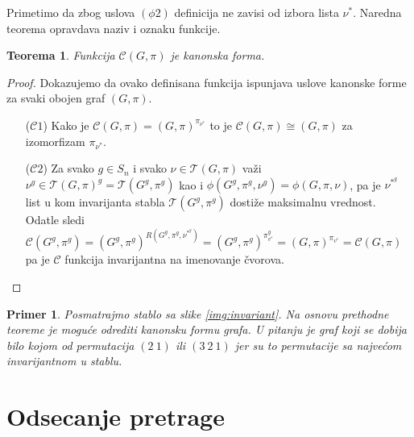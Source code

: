 \documentclass[12pt,oneside]{memoir}
\newtheorem{theorem}{Teorema}
\newtheorem{example}{Primer}
\theoremstyle{definition}
\begin{document}
  Primetimo da zbog uslova $(\phi2)$ definicija ne zavisi od izbora lista
  $\nu^*$. Naredna teorema opravdava naziv i oznaku funkcije.

  \begin{theorem}
	  Funkcija $\mathcal{C}(G, \pi)$ je kanonska forma.
  \end{theorem}

  \begin{proof}
		Dokazujemo da ovako definisana funkcija ispunjava uslove kanonske forme za
		svaki obojen graf $(G, \pi)$.
	  \begin{itemize}
		  \item [($\mathcal{C}1$)] Kako je $\mathcal{C}(G, \pi) = (G,
			  \pi)^{\pi_{\nu^*}}$ to je $\mathcal{C}(G, \pi) \cong (G, \pi)$ za
			  izomorfizam $\pi_{\nu^*}$.
		  \item [($\mathcal{C}2$)] Za svako $g \in S_n$ i svako $\nu \in
			  \mathcal{T}(G, \pi)$ važi $\nu^g \in \mathcal{T}(G, \pi)^g =
			  \mathcal{T}(G^g, \pi^g)$ kao i $\phi(G^g, \pi^g, \nu^g) = \phi(G,
			  \pi, \nu)$, pa je $\nu^*^g$ list u kom invarijanta stabla
			  $\mathcal{T}(G^g, \pi^g)$ dostiže maksimalnu vrednost.  Odatle
			  sledi $\mathcal{C}(G^g, \pi^g) = (G^g, \pi^g)^{R(G^g, \pi^g,
			  \nu^*^g)} = (G^g, \pi^g)^{\pi_{v^*}^g} = (G, \pi)^{\pi_{v^*}} =
			  \mathcal{C}(G, \pi)$ pa je $\mathcal{C}$ funkcija invarijantna na
			  imenovanje čvorova.
	  \end{itemize}
  \end{proof}

	\begin{example}
		Posmatrajmo stablo sa slike \ref{img:invariant}. Na osnovu prethodne
		teoreme je moguće odrediti kanonsku formu grafa. U pitanju je graf koji
		se dobija bilo kojom od permutacija $(2\ 1)$ ili $(3\ 2\ 1)$ jer su to
		permutacije sa najvećom invarijantnom u stablu.
	\end{example}

 \section{Odsecanje pretrage}
\end{document}
